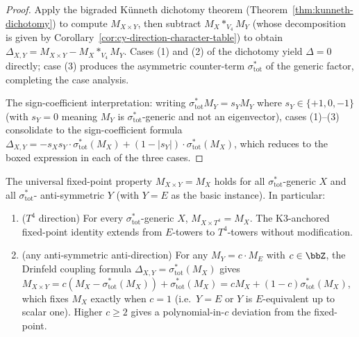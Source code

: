 \begin{proof}
Apply the bigraded Künneth dichotomy theorem
\textup{(}Theorem~\ref{thm:kunneth-dichotomy}\textup{)} to compute
$M_{X \times Y}$, then subtract
$M_X *_{V_4} M_Y$ \textup{(}whose decomposition is given by
Corollary~\ref{cor:cy-direction-character-table}\textup{)} to obtain
$\Delta_{X, Y} = M_{X \times Y} - M_X *_{V_4} M_Y$. Cases \textup{(1)} and
\textup{(2)} of the dichotomy yield $\Delta = 0$ directly; case \textup{(3)}
produces the asymmetric counter-term $\sigma_{\mathrm{tot}}^*$ of the generic
factor, completing the case analysis.

The sign-coefficient interpretation: writing
$\sigma_{\mathrm{tot}}^* M_Y = s_Y M_Y$ where $s_Y \in \{+1, 0, -1\}$
\textup{(}with $s_Y = 0$ meaning $M_Y$ is $\sigma_{\mathrm{tot}}^*$-generic
and not an eigenvector\textup{),} cases \textup{(1)}--\textup{(3)} consolidate
to the sign-coefficient formula
$\Delta_{X, Y} = -s_X s_Y \cdot \sigma_{\mathrm{tot}}^*(M_X)
 + (1 - |s_Y|) \cdot \sigma_{\mathrm{tot}}^*(M_X)$, which
reduces to the boxed expression in each of the three cases.
\end{proof}

\begin{corollary}
\label{cor:drinfeld-fixed-points-non-elliptic}
The universal fixed-point property $M_{X \times Y} = M_X$ holds for all
$\sigma_{\mathrm{tot}}^*$-generic $X$ and all $\sigma_{\mathrm{tot}}^*$-
anti-symmetric $Y$ \textup{(}with $Y = E$ as the basic instance\textup{).} In particular:
\begin{enumerate}[label=\textup{(\roman*)}]
 \item \textup{($T^4$ direction)} For every $\sigma_{\mathrm{tot}}^*$-generic
 $X$, $M_{X \times T^4} = M_X$. The K$3$-anchored fixed-point identity
 extends from $E$-towers to $T^4$-towers without modification.
 \item \textup{(any anti-symmetric anti-direction)} For any
 $M_Y = c \cdot M_E$ with $c \in \bbZ$, the
 Drinfeld coupling formula
 $\Delta_{X, Y} = \sigma_{\mathrm{tot}}^*(M_X)$ gives
 $M_{X \times Y} = c (M_X - \sigma_{\mathrm{tot}}^*(M_X))
 + \sigma_{\mathrm{tot}}^*(M_X)
 = c M_X + (1 - c) \sigma_{\mathrm{tot}}^*(M_X)$,
 which fixes $M_X$ exactly when $c = 1$ \textup{(}i.e.\ $Y = E$ or
 $Y$ is $E$-equivalent up to scalar one\textup{).} Higher $c \geq 2$
 gives a polynomial-in-$c$ deviation from the fixed-point.
\end{enumerate}
\end{corollary}

